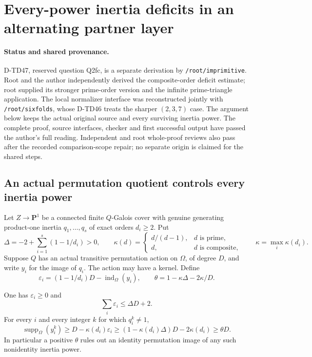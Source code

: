 \section{Every-power inertia deficits in an alternating partner layer}
\label{sec:projected-inertia-power-deficit}

\paragraph{Status and shared provenance.}
D-TD47, reserved question Q2fc, is a separate derivation by
\texttt{/root/imprimitive}. Root and the author independently derived
the composite-order deficit estimate; root supplied its stronger
prime-order version and the infinite prime-triangle application.
The local normalizer interface was reconstructed jointly with
\texttt{/root/sixfolds}, whose D-TD46 treats the sharper
\((2,3,7)\) case. The argument below keeps the actual original
source and every surviving inertia power. The complete proof, source interfaces, checker and first successful
output have passed the author's full reading. Independent and root whole-proof
reviews also pass after the recorded comparison-scope repair; no separate origin is claimed for the shared steps.

\subsection*{An actual permutation quotient controls every inertia power}

Let \(Z\longrightarrow\mathbf P^1\) be a connected finite
\(Q\)-Galois cover with genuine generating product-one inertia
\(q_1,\ldots,q_s\) of exact orders \(d_i\ge2\). Put
\[
 \Delta=-2+\sum_{i=1}^s(1-1/d_i)>0,\qquad
 \kappa(d)=
 \begin{cases}
 d/(d-1),&d\text{ is prime},\\
 d,&d\text{ is composite},
 \end{cases}
 \qquad \kappa=\max_i\kappa(d_i).
 \tag{IPD.1}
\]
Suppose \(Q\) has an actual transitive permutation action on
\(\Omega\), of degree \(D\), and write \(y_i\) for the image
of \(q_i\). The action may have a kernel. Define
\[
 \varepsilon_i=(1-1/d_i)D-\operatorname{ind}_\Omega(y_i),
 \qquad
 \theta=1-\kappa\Delta-2\kappa/D.
 \tag{IPD.2}
\]

\begin{lemma}
One has \(\varepsilon_i\ge0\) and
\[
 \sum_i\varepsilon_i\le\Delta D+2.
 \tag{IPD.3}
\]
For every \(i\) and every integer \(k\) for which
\(q_i^k\ne1\),
\[
 \operatorname{supp}_\Omega(y_i^k)
 \ge D-\kappa(d_i)\varepsilon_i
 \ge(1-\kappa(d_i)\Delta)D-2\kappa(d_i)
 \ge\theta D.
 \tag{IPD.4}
\]
In particular a positive \(\theta\) rules out an identity
permutation image of any such nonidentity inertia power.
\end{lemma}

